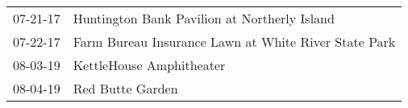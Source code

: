 \begin{supertabular}{p{0.25\columnwidth}p{0.75\columnwidth}}
 07-21-17 &          Huntington Bank Pavilion at Northerly Island \\
 07-22-17 &  Farm Bureau Insurance Lawn at White River State Park \\
 08-03-19 &                              KettleHouse Amphitheater \\
 08-04-19 &                                      Red Butte Garden \\
\end{supertabular}

